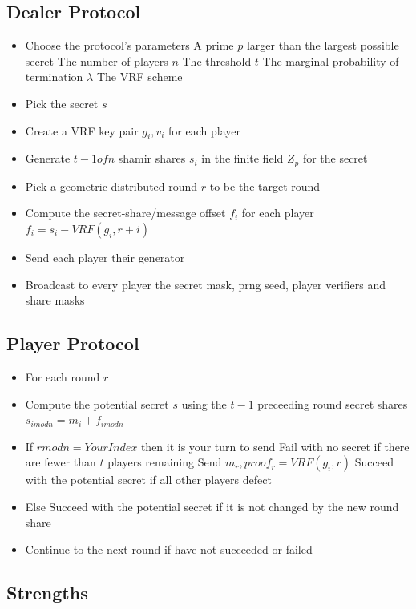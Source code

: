 \documentclass{dalcsthesis}
\begin{document}
\subsection{Dealer Protocol}
\begin{itemize}
  \item Choose the protocol's parameters
    \subitem A prime $p$ larger than the largest possible secret
    \subitem The number of players $n$
    \subitem The threshold $t$
    \subitem The marginal probability of termination $\lambda$
    \subitem The VRF scheme
  \item Pick the secret $s$
  \item Create a VRF key pair $g_i, v_i$ for each player
  \item Generate $t-1 of n$ shamir shares $s_i$ in the finite field $Z_p$ for the secret 
  \item Pick a geometric-distributed round $r$ to be the target round
  \item Compute the secret-share/message offset $f_i$ for each player
    \subitem $f_i = s_i - VRF(g_i, r+i)$
  \item Send each player their generator
  \item Broadcast to every player the secret mask, prng seed, player verifiers and share masks
\end{itemize}

\subsection{Player Protocol}
\begin{itemize}
  \item For each round $r$
  \item Compute the potential secret $s$ using the $t-1$ preceeding round secret shares
    \subitem $s_{i mod n} = m_i + f_{i mod n}$
  \item If $r mod n = YourIndex$ then it is your turn to send
    \subitem Fail with no secret if there are fewer than $t$ players remaining
    \subitem Send $m_r, proof_r = VRF(g_i, r)$
  	\subitem Succeed with the potential secret if all other players defect
  \item Else
    \subitem Succeed with the potential secret if it is not changed by the new round share
  \item Continue to the next round if have not succeeded or failed 
\end{itemize}

\subsection{Strengths}
\end{document}

